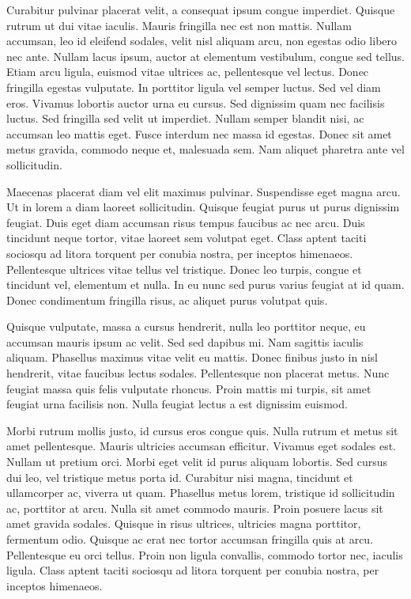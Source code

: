 \documentclass{homework}
\begin{document}
Curabitur pulvinar placerat velit, a consequat ipsum congue imperdiet. Quisque rutrum ut dui vitae iaculis. Mauris fringilla nec est non mattis. Nullam accumsan, leo id eleifend sodales, velit nisl aliquam arcu, non egestas odio libero nec ante. Nullam lacus ipsum, auctor at elementum vestibulum, congue sed tellus. Etiam arcu ligula, euismod vitae ultrices ac, pellentesque vel lectus. Donec fringilla egestas vulputate. In porttitor ligula vel semper luctus. Sed vel diam eros. Vivamus lobortis auctor urna eu cursus. Sed dignissim quam nec facilisis luctus. Sed fringilla sed velit ut imperdiet. Nullam semper blandit nisi, ac accumsan leo mattis eget. Fusce interdum nec massa id egestas. Donec sit amet metus gravida, commodo neque et, malesuada sem. Nam aliquet pharetra ante vel sollicitudin.

Maecenas placerat diam vel elit maximus pulvinar. Suspendisse eget magna arcu. Ut in lorem a diam laoreet sollicitudin. Quisque feugiat purus ut purus dignissim feugiat. Duis eget diam accumsan risus tempus faucibus ac nec arcu. Duis tincidunt neque tortor, vitae laoreet sem volutpat eget. Class aptent taciti sociosqu ad litora torquent per conubia nostra, per inceptos himenaeos. Pellentesque ultrices vitae tellus vel tristique. Donec leo turpis, congue et tincidunt vel, elementum et nulla. In eu nunc sed purus varius feugiat at id quam. Donec condimentum fringilla risus, ac aliquet purus volutpat quis.

Quisque vulputate, massa a cursus hendrerit, nulla leo porttitor neque, eu accumsan mauris ipsum ac velit. Sed sed dapibus mi. Nam sagittis iaculis aliquam. Phasellus maximus vitae velit eu mattis. Donec finibus justo in nisl hendrerit, vitae faucibus lectus sodales. Pellentesque non placerat metus. Nunc feugiat massa quis felis vulputate rhoncus. Proin mattis mi turpis, sit amet feugiat urna facilisis non. Nulla feugiat lectus a est dignissim euismod.

Morbi rutrum mollis justo, id cursus eros congue quis. Nulla rutrum et metus sit amet pellentesque. Mauris ultricies accumsan efficitur. Vivamus eget sodales est. Nullam ut pretium orci. Morbi eget velit id purus aliquam lobortis. Sed cursus dui leo, vel tristique metus porta id. Curabitur nisi magna, tincidunt et ullamcorper ac, viverra ut quam. Phasellus metus lorem, tristique id sollicitudin ac, porttitor at arcu. Nulla sit amet commodo mauris. Proin posuere lacus sit amet gravida sodales. Quisque in risus ultrices, ultricies magna porttitor, fermentum odio. Quisque ac erat nec tortor accumsan fringilla quis at arcu. Pellentesque eu orci tellus. Proin non ligula convallis, commodo tortor nec, iaculis ligula. Class aptent taciti sociosqu ad litora torquent per conubia nostra, per inceptos himenaeos.
\end{document}
